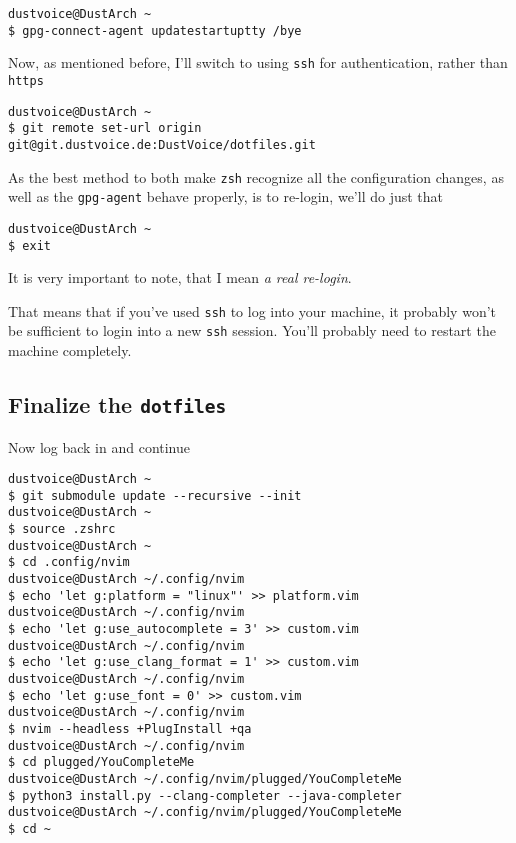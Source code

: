 \documentclass[10pt]{dustdoc}
\begin{document}
\begin{verbatim}
dustvoice@DustArch ~
$ gpg-connect-agent updatestartuptty /bye
\end{verbatim}


Now, as mentioned before, I’ll switch to using \texttt{ssh} for authentication, rather than \texttt{https}

\begin{verbatim}
dustvoice@DustArch ~
$ git remote set-url origin git@git.dustvoice.de:DustVoice/dotfiles.git
\end{verbatim}

As the best method to both make \texttt{zsh} recognize all the configuration changes, as well as the \texttt{gpg-agent} behave properly, is to re-login, we’ll do just that

\begin{verbatim}
dustvoice@DustArch ~
$ exit
\end{verbatim}

\begin{WARNING}
    It is very important to note, that I mean \emph{a real re-login}.

    That means that if you’ve used \texttt{ssh} to log into your machine, it probably won’t be sufficient to login into a new \texttt{ssh} session.
    You’ll probably need to restart the machine completely.
\end{WARNING}

\subsection{Finalize the \texttt{dotfiles}}
\label{sec:finalize-the-dotfiles}

Now log back in and continue

\begin{verbatim}
dustvoice@DustArch ~
$ git submodule update --recursive --init
dustvoice@DustArch ~
$ source .zshrc
dustvoice@DustArch ~
$ cd .config/nvim
dustvoice@DustArch ~/.config/nvim
$ echo 'let g:platform = "linux"' >> platform.vim
dustvoice@DustArch ~/.config/nvim
$ echo 'let g:use_autocomplete = 3' >> custom.vim
dustvoice@DustArch ~/.config/nvim
$ echo 'let g:use_clang_format = 1' >> custom.vim
dustvoice@DustArch ~/.config/nvim
$ echo 'let g:use_font = 0' >> custom.vim
dustvoice@DustArch ~/.config/nvim
$ nvim --headless +PlugInstall +qa
dustvoice@DustArch ~/.config/nvim
$ cd plugged/YouCompleteMe
dustvoice@DustArch ~/.config/nvim/plugged/YouCompleteMe
$ python3 install.py --clang-completer --java-completer
dustvoice@DustArch ~/.config/nvim/plugged/YouCompleteMe
$ cd ~
\end{verbatim}
\end{document}
